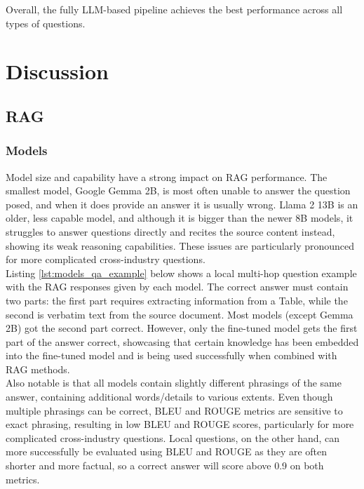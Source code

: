 Overall, the fully LLM-based pipeline achieves the best performance across all types of questions.

\section{Discussion}

\subsection{RAG}
\subsubsection{Models}\label{models_discussion}

Model size and capability have a strong impact on RAG performance. The smallest model, Google Gemma 2B, is most often unable to answer the question posed, and when it does provide an answer it is usually wrong. Llama 2 13B is an older, less capable model, and although it is bigger than the newer 8B models, it struggles to answer questions directly and recites the source content instead, showing its weak reasoning capabilities. These issues are particularly pronounced for more complicated cross-industry questions.\\

Listing \ref{lst:models_qa_example} below shows a local multi-hop question example with the RAG responses given by each model. The correct answer must contain two parts: the first part requires extracting information from a Table, while the second is verbatim text from the source document. Most models (except Gemma 2B) got the second part correct. However, only the fine-tuned model gets the first part of the answer correct, showcasing that certain knowledge has been embedded into the fine-tuned model and is being used successfully when combined with RAG methods.\\

Also notable is that all models contain slightly different phrasings of the same answer, containing additional words/details to various extents. Even though multiple phrasings can be correct, BLEU and ROUGE metrics are sensitive to exact phrasing, resulting in low BLEU and ROUGE scores, particularly for more complicated cross-industry questions. Local questions, on the other hand, can more successfully be evaluated using BLEU and ROUGE as they are often shorter and more factual, so a correct answer will score above 0.9 on both metrics.

